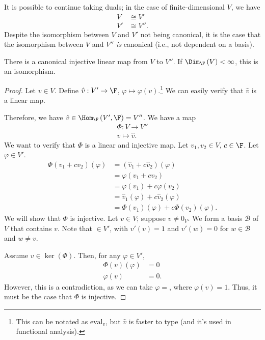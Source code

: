 \documentclass[10pt]{mypackage}
\begin{document}
\begin{remark}
  It is possible to continue taking duals; in the case of finite-dimensional $V$, we have
  \begin{align*}
    V &\cong V'\\
    V' &\cong V''.
  \end{align*}
  Despite the isomorphism between $V$ and $V'$ not being canonical, it is the case that the isomorphism between $V$ and $V''$ \textit{is} canonical (i.e., not dependent on a basis).
\end{remark}
\begin{proposition}
  There is a canonical injective linear map from $V$ to $V''$. If $\Dim_{\F}\left(V\right) < \infty$, this is an isomorphism.
\end{proposition}
\begin{proof}
  Let $v\in V$. Define $\hat{v}: V' \rightarrow \F$, $\varphi \mapsto \varphi(v)$.\footnote{This can be notated as $\text{eval}_v$, but $\hat{v}$ is faster to type (and it's used in functional analysis).} We can easily verify that $\hat{v}$ is a linear map.\newline

  Therefore, we have $\hat{v}\in \Hom_{\F}\left(V',\F\right) = V''$. We have a map
  \begin{align*}
    \Phi: V\rightarrow V''\\
    v\mapsto \hat{v}.
  \end{align*}
  We want to verify that $\Phi$ is a linear and injective map. Let $v_1,v_2\in V$, $c\in \F$. Let $\varphi\in V'$.
  \begin{align*}
    \Phi\left(v_1 + cv_2\right)\left(\varphi\right) &= \left(\hat{v}_1 + c\hat{v}_2\right)\left(\varphi\right)\\
                                                    &= \varphi\left(v_1 + cv_2\right)\\
                                                    &= \varphi\left(v_1\right) + c\varphi\left(v_2\right)\\
                                                    &= \hat{v}_1\left(\varphi\right) + c\hat{v}_2\left(\varphi\right)\\
                                                    &= \Phi\left(v_1\right)(\varphi) + c\Phi\left(v_2\right)\left(\varphi\right).
  \end{align*}
  We will show that $\Phi$ is injective. Let $v\in V$; suppose $v\neq 0_V$. We form a basis $\mathcal{B}$ of $V$ that contains $v$. Note that $\in V'$, with $v'(v) = 1$ and $v'(w) = 0$ for $w\in \mathcal{B}$ and $w\neq v$.\newline
  
  Assume $v\in \ker\left(\Phi\right)$. Then, for any $\varphi\in V'$,
  \begin{align*}
    \Phi\left(v\right)(\varphi) &= 0\\
    \varphi(v) &= 0.
  \end{align*}
  However, this is a contradiction, as we can take $\varphi = $, where $\varphi(v) = 1$. Thus, it must be the case that $\Phi$ is injective.
\end{proof}
\end{document}
